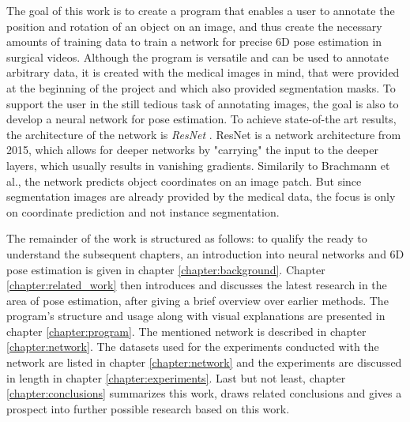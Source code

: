 The goal of this work is to create a program that enables a user to annotate the position and rotation of an object on an image, and thus create the necessary amounts of training data to train a network for precise 6D pose estimation in surgical videos. Although the program is versatile and can be used to annotate arbitrary data, it is created with the medical images in mind, that were provided at the beginning of the project and which also provided segmentation masks. To support the user in the still tedious task of annotating images, the goal is also to develop a neural network for pose estimation. To achieve state-of-the art results, the architecture of the network is \textit{ResNet} \cite{resnet}. ResNet is a network architecture from 2015, which allows for deeper networks by "carrying" the input to the deeper layers, which usually results in vanishing gradients. Similarily to Brachmann et al., the network predicts object coordinates on an image patch. But since segmentation images are already provided by the medical data, the focus is only on coordinate prediction and not instance segmentation. \

The remainder of the work is structured as follows: to qualify the ready to understand the subsequent chapters, an introduction into neural networks and 6D pose estimation is given in chapter \ref{chapter:background}. Chapter \ref{chapter:related_work} then introduces and discusses the latest research in the area of pose estimation, after giving a brief overview over earlier methods. The program's structure and usage along with visual explanations are presented in chapter \ref{chapter:program}. The mentioned network is described in chapter \ref{chapter:network}. The datasets used for the experiments conducted with the network are listed in chapter \ref{chapter:network} and the experiments are discussed in length in chapter \ref{chapter:experiments}. Last but not least, chapter \ref{chapter:conclusions} summarizes this work, draws related conclusions and gives a prospect into further possible research based on this work.